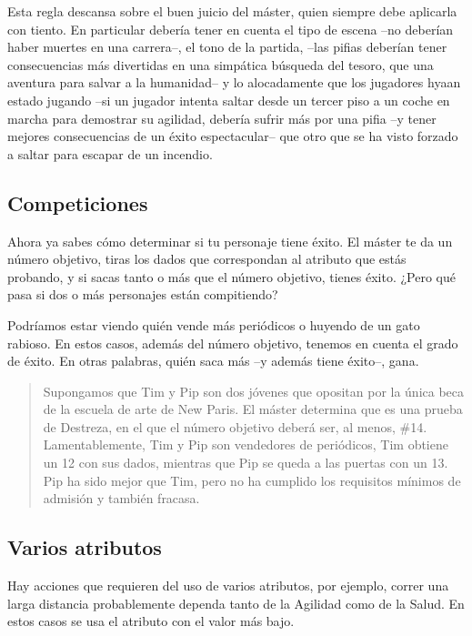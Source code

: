 Esta regla descansa sobre el buen juicio del máster, quien siempre debe aplicarla con tiento. En particular debería tener en cuenta el tipo de escena --no deberían haber muertes en una carrera--, el tono de la partida, --las pifias deberían tener consecuencias más divertidas en una simpática búsqueda del tesoro, que una aventura para salvar a la humanidad-- y lo alocadamente que los jugadores hyaan estado jugando --si un jugador intenta saltar desde un tercer piso a un coche en marcha para demostrar su agilidad, debería sufrir más por una pifia --y tener mejores consecuencias de un éxito espectacular-- que otro que se ha visto forzado a saltar para escapar de un incendio.


\subsection{Competiciones}

Ahora ya sabes cómo determinar si tu personaje tiene éxito. El máster te da
un número objetivo, tiras los dados que correspondan al atributo que estás probando,
y si sacas tanto o más que el número objetivo, tienes éxito. ¿Pero qué pasa
si dos o más personajes están compitiendo?

Podríamos estar viendo quién vende más periódicos o huyendo de un gato rabioso.
En estos casos, además del número objetivo, tenemos en cuenta el grado de éxito.
En otras palabras, quién saca más --y además tiene éxito--, gana.

\begin{quotation}
Supongamos que Tim y Pip son dos jóvenes que opositan por la única beca de la
escuela de arte de New Paris. El máster determina que es una prueba de Destreza,
en el que el número objetivo deberá ser, al menos, \#14. Lamentablemente, Tim y
Pip son vendedores de periódicos, Tim obtiene un 12 con sus dados, mientras que 
Pip se queda a las puertas con un 13. Pip ha sido mejor que Tim, pero no ha cumplido
los requisitos mínimos de admisión y también fracasa.
\end{quotation}

\subsection{Varios atributos}

Hay acciones que requieren del uso de varios atributos, por ejemplo, correr una larga distancia probablemente dependa tanto de la Agilidad como de la Salud. En estos casos se usa el atributo con el valor más bajo.


